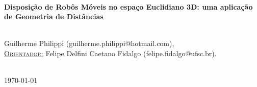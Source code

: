 \documentclass[a4paper,12pt]{report}
\begin{document}
\begin{titlepage}
		
		
		\HRule \\[0.4cm]
		{ \LARGE \bfseries \textbf{Disposição de Robôs Móveis no espaço Euclidiano 3D: uma aplicação de Geometria de Distâncias}} \\ [0.4cm] %
		\HRule \\[2cm]
		
		
		\begin{minipage}{1\textwidth}
			\begin{center} \large
				Guilherme Philippi (guilherme.philippi@hotmail.com),
				\vspace{0.5cm}
				\\
				\underline{\textsc{Orientador:}} \vspace{0.2cm}
				Felipe Delfini Caetano Fidalgo (felipe.fidalgo@ufsc.br).
			\end{center}
		\end{minipage} \\[2cm]
		
		
		{\large \today} %
		
		
		\vfill %
		
	\end{titlepage}
	
	
	\newpage
	\tableofcontents
	\newpage
	
\end{document}
